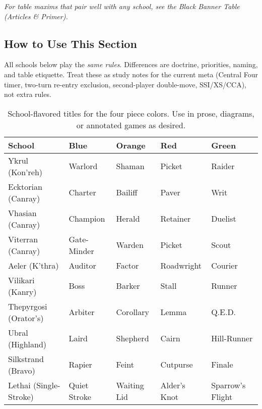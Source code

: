 \documentclass[11pt]{article}
\renewcommand{\arraystretch}{1.15}
\begin{document}
\vspace{0.35em}
\noindent\textit{\color{muted}For table maxims that pair well with any school, see the \emph{Black Banner Table (Articles \& Primer)}.}

\subsection*{How to Use This Section}
All schools below play the \emph{same rules}. Differences are doctrine, priorities, naming, and table etiquette. Treat these as study notes for the current meta (Central Four timer, two-turn re-entry exclusion, second-player double-move, SSI/XS/CCA), not extra rules.


\begin{table}[h]
\centering
\small
\setlength{\tabcolsep}{6pt}
\renewcommand{\arraystretch}{1.15}
\begin{tabular}{@{}lllll@{}}
\toprule
\textbf{School} & \textbf{Blue} & \textbf{Orange} & \textbf{Red} & \textbf{Green}\\
\midrule
Ykrul (Kon'reh)      & Warlord        & Shaman        & Picket      & Raider\\
Ecktorian (Canray)   & Charter        & Bailiff       & Paver       & Writ\\
Vhasian (Canray)     & Champion       & Herald        & Retainer    & Duelist\\
Viterran (Canray)    & Gate-Minder    & Warden        & Picket      & Scout\\
Aeler (K’thra)       & Auditor        & Factor        & Roadwright    & Courier\\
Vilikari (Kanry)     & Boss      & Barker        & Stall     & Runner\\
Thepyrgosi (Orator’s)& Arbiter        & Corollary     & Lemma       & Q.E.D.\\
Ubral (Highland)     & Laird          & Shepherd      & Cairn       & Hill-Runner\\
Silkstrand (Bravo)   & Rapier         & Feint         & Cutpurse    & Finale\\
Lethai (Single-Stroke) & Quiet Stroke & Waiting Lid & Alder’s Knot & Sparrow’s Flight\\
\bottomrule
\end{tabular}
\caption{School-flavored titles for the four piece colors. Use in prose, diagrams, or annotated games as desired.}
\end{table}
\end{document}
